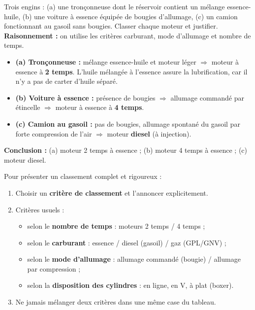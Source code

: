 \documentclass[11pt]{article}
\begin{document}
\begin{exoresolu}
Trois engins : (a) une tronçonneuse dont le réservoir contient un mélange essence-huile, (b) une voiture à essence équipée de bougies d'allumage, (c) un camion fonctionnant au gasoil sans bougies. Classer chaque moteur et justifier.
\tcblower
\textbf{Raisonnement :} on utilise les critères carburant, mode d'allumage et nombre de temps.
\begin{itemize}
\item \textbf{(a) Tronçonneuse :} mélange essence-huile et moteur léger $\Rightarrow$ moteur à essence à \textbf{2 temps}. L'huile mélangée à l'essence assure la lubrification, car il n'y a pas de carter d'huile séparé.
\item \textbf{(b) Voiture à essence :} présence de bougies $\Rightarrow$ allumage commandé par étincelle $\Rightarrow$ moteur à essence à \textbf{4 temps}.
\item \textbf{(c) Camion au gasoil :} pas de bougies, allumage spontané du gasoil par forte compression de l'air $\Rightarrow$ moteur \textbf{diesel} (à injection).
\end{itemize}
\textbf{Conclusion :} (a) moteur 2 temps à essence ; (b) moteur 4 temps à essence ; (c) moteur diesel.
\end{exoresolu}

\begin{methode}
Pour présenter un classement complet et rigoureux :
\begin{enumerate}
\item Choisir un \textbf{critère de classement} et l'annoncer explicitement.
\item Critères usuels :
\begin{itemize}
\item selon le \textbf{nombre de temps} : moteurs 2 temps / 4 temps ;
\item selon le \textbf{carburant} : essence / diesel (gasoil) / gaz (GPL/GNV) ;
\item selon le \textbf{mode d'allumage} : allumage commandé (bougie) / allumage par compression ;
\item selon la \textbf{disposition des cylindres} : en ligne, en V, à plat (boxer).
\end{itemize}
\item Ne jamais mélanger deux critères dans une même case du tableau.
\end{enumerate}
\end{methode}
\end{document}
